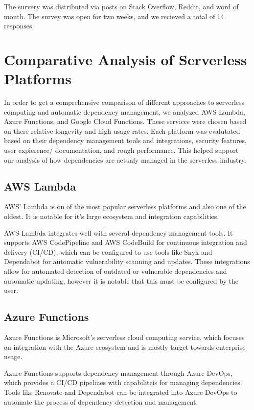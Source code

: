 \documentclass[sigconf]{acmart}
\begin{document}
The survery was distributed via posts on Stack Overflow, Reddit, and word of mouth. The survey was open for two weeks, and we recieved a total of 14 responses. 

\section{Comparative Analysis of Serverless Platforms}

In order to get a comprehensive comparison of different approaches to serverless computing and automatic dependency management, we analyzed AWS Lambda, Azure Functions, and Google Cloud Functions. These services were chosen based on there relative longevity and high usage rates. Each platform was evalutated based on their dependency management tools and integrations, security features, user expierence/ documentation, and rough performance. This helped support our analysis of how dependencies are actualy managed in the serverless industry.

\subsection{AWS Lambda}

AWS' Lambda is on of the most popular serverless platforms and also one of the oldest. It is notable for it's large ecosystem and integration capabilities.

AWS Lambda integrates well with several dependency management tools. It supports AWS CodePipeline and AWS CodeBuild for continuous integration and delivery (CI/CD), which can be configured to use tools like Snyk and Dependabot for automatic vulnerability scanning and updates. These integrations allow for automated detection of outdated or vulnerable dependencies and automatic updating, however it is notable that this must be configured by the user.

\subsection{Azure Functions}

Azure Functions is Microsoft's serverless cloud computing service, which focuses on integration with the Azure ecosystem and is mostly target towards enterprise usage. 

Azure Functions supports dependency management through Azure DevOps, which provides a CI/CD pipelines with capabiliteis for managing dependencies. Tools like Renovate and Dependabot can be integrated into Azure DevOps to automate the process of dependency detection and management. 
\end{document}
